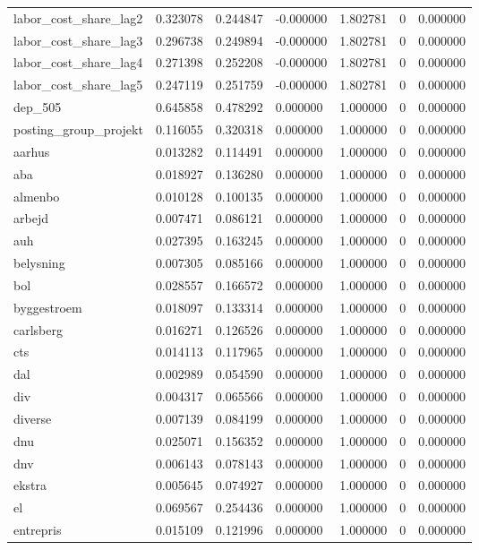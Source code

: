 \begin{landscape}
\begin{longtable}[h!]{lrrllrr}
labor_cost_share_lag2 & 0.323078 & 0.244847 & -0.000000 & 1.802781 & 0 & 0.000000 \\
labor_cost_share_lag3 & 0.296738 & 0.249894 & -0.000000 & 1.802781 & 0 & 0.000000 \\
labor_cost_share_lag4 & 0.271398 & 0.252208 & -0.000000 & 1.802781 & 0 & 0.000000 \\
labor_cost_share_lag5 & 0.247119 & 0.251759 & -0.000000 & 1.802781 & 0 & 0.000000 \\
dep_505 & 0.645858 & 0.478292 & 0.000000 & 1.000000 & 0 & 0.000000 \\
posting_group_projekt & 0.116055 & 0.320318 & 0.000000 & 1.000000 & 0 & 0.000000 \\
aarhus & 0.013282 & 0.114491 & 0.000000 & 1.000000 & 0 & 0.000000 \\
aba & 0.018927 & 0.136280 & 0.000000 & 1.000000 & 0 & 0.000000 \\
almenbo & 0.010128 & 0.100135 & 0.000000 & 1.000000 & 0 & 0.000000 \\
arbejd & 0.007471 & 0.086121 & 0.000000 & 1.000000 & 0 & 0.000000 \\
auh & 0.027395 & 0.163245 & 0.000000 & 1.000000 & 0 & 0.000000 \\
belysning & 0.007305 & 0.085166 & 0.000000 & 1.000000 & 0 & 0.000000 \\
bol & 0.028557 & 0.166572 & 0.000000 & 1.000000 & 0 & 0.000000 \\
byggestroem & 0.018097 & 0.133314 & 0.000000 & 1.000000 & 0 & 0.000000 \\
carlsberg & 0.016271 & 0.126526 & 0.000000 & 1.000000 & 0 & 0.000000 \\
cts & 0.014113 & 0.117965 & 0.000000 & 1.000000 & 0 & 0.000000 \\
dal & 0.002989 & 0.054590 & 0.000000 & 1.000000 & 0 & 0.000000 \\
div & 0.004317 & 0.065566 & 0.000000 & 1.000000 & 0 & 0.000000 \\
diverse & 0.007139 & 0.084199 & 0.000000 & 1.000000 & 0 & 0.000000 \\
dnu & 0.025071 & 0.156352 & 0.000000 & 1.000000 & 0 & 0.000000 \\
dnv & 0.006143 & 0.078143 & 0.000000 & 1.000000 & 0 & 0.000000 \\
ekstra & 0.005645 & 0.074927 & 0.000000 & 1.000000 & 0 & 0.000000 \\
el & 0.069567 & 0.254436 & 0.000000 & 1.000000 & 0 & 0.000000 \\
entrepris & 0.015109 & 0.121996 & 0.000000 & 1.000000 & 0 & 0.000000 \\

\end{longtable}
\end{landscape}
